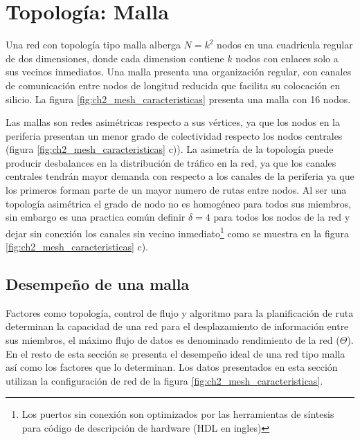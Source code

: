 \section{Topología: Malla} 
	\label{sec:topologia_malla}
	


Una red con topología tipo malla alberga $N = k^2$ nodos en una cuadricula regular de dos dimensiones, donde cada dimension contiene $k$ nodos con enlaces solo a sus vecinos inmediatos. Una malla presenta una organización regular, con canales de comunicación entre nodos de longitud reducida que facilita su colocación en silicio. La figura \ref{fig:ch2_mesh_caracteristicas} presenta una malla con 16 nodos.

Las mallas son redes asimétricas respecto a sus vértices, ya que los nodos en la periferia presentan un menor grado de colectividad respecto los nodos centrales (figura \ref{fig:ch2_mesh_caracteristicas} c)). La asimetría de la topología puede producir desbalances en la distribución de tráfico en la red, ya que los canales centrales tendrán mayor demanda con respecto a los canales de la periferia ya que los primeros forman parte de un mayor numero de rutas entre nodos. Al ser una topología asimétrica el grado de nodo no es homogéneo para todos sus miembros, sin embargo es una practica común definir $\delta = 4$ para todos los nodos de la red y dejar sin conexión los canales sin vecino inmediato\footnote{Los puertos sin conexión son optimizados por las herramientas de síntesis para código de descripción de hardware (HDL en ingles)} como se muestra en la figura \ref{fig:ch2_mesh_caracteristicas} c).

\subsection{Desempeño de una malla}

Factores como topología, control de flujo y algoritmo para la planificación de ruta determinan la capacidad de una red para el desplazamiento de información entre sus miembros, el máximo flujo de datos es denominado rendimiento de la red ($\Theta$). En el resto de esta sección se presenta el desempeño ideal de una red tipo malla así como los factores que lo determinan. Los datos presentados en esta sección utilizan la configuración de red de la figura \ref{fig:ch2_mesh_caracteristicas}. 
 
